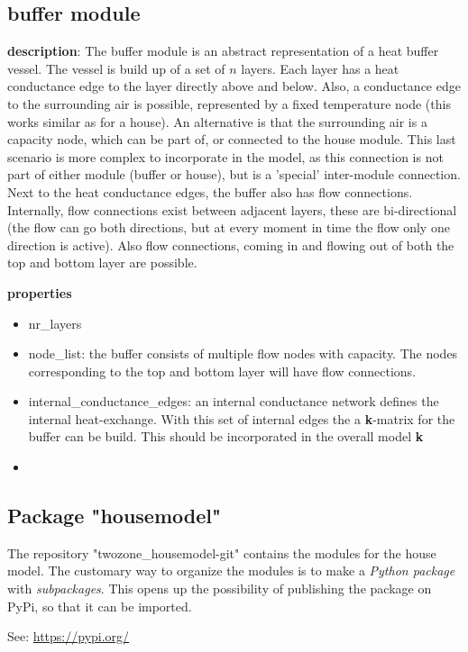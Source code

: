 \subsection{buffer module}
\textbf{description}: The buffer module is an abstract representation of a heat buffer vessel. The vessel is build up of a set of $n$ layers. Each layer has a heat conductance edge to the layer directly above and below. Also, a conductance edge to the surrounding air is possible, represented by a fixed temperature node (this works similar as for a house). An alternative is that the surrounding air is a capacity node, which can be part of, or connected to the house module. This last scenario is more complex to incorporate in the model, as this connection is not part of either module (buffer or house), but is a 'special' inter-module connection. Next to the heat conductance edges, the buffer also has flow connections. Internally, flow connections exist between adjacent layers, these are bi-directional (the flow can go both directions, but at every moment in time the flow only one direction is active). Also flow connections, coming in and flowing out of both the top and bottom layer are possible. 

\textbf{properties}
\begin{itemize}
	\item nr\_layers
	\item node\_list: the buffer consists of multiple flow nodes with capacity. The nodes corresponding to the top and bottom layer will have flow connections. 
	\item internal_conductance_edges: an internal conductance network defines the internal heat-exchange. With this set of internal edges the a  \textbf{k}-matrix  for the buffer can be build. This should be incorporated in the overall model \textbf{k}
	\item 
\end{itemize}


\subsection{Package "housemodel"}

The repository "\textsf{twozone\_housemodel-git}" contains the modules for the house model. The customary way to organize the modules is to make a \emph{Python package} with \emph{subpackages}. This opens up the possibility of publishing the package on PyPi, so that it can be imported.

See: \url{https://pypi.org/}

